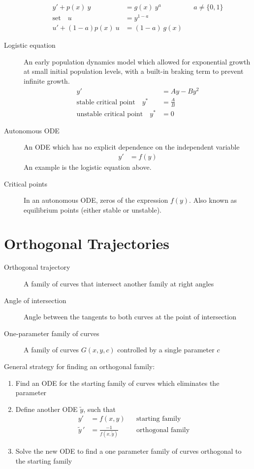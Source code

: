 \begin{description}
\begin{align}
            y' + p(x)\ y       & = g(x)\ y^{a} &  & a \neq \{ 0, 1\} \\
            \text{set} \quad u & = y^{1-a}                           \\
            u' + (1-a)p(x)\ u  & = (1-a)\ g(x)
        \end{align}
    \item[Logistic equation] An early population dynamics model which allowed for exponential
        growth at small initial population levels, with a built-in braking term to prevent infinite
        growth.
        \begin{align}
            y'                                         & = Ay - By^{2} \\
            \text{stable critical point} \quad y^{*}   & = \frac{A}{B} \\
            \text{unstable critical point} \quad y^{*} & = 0
        \end{align}
    \item[Autonomous ODE] An ODE which has no explicit dependence on the independent variable
        \begin{align}
            y' & = f(y)
        \end{align}
        An example is the logistic equation above.
    \item[Critical points] In an autonomous ODE, zeros of the expression $ f(y) $. Also known
        as equilibrium points (either stable or unstable).
\end{description}

\section{Orthogonal Trajectories}

\begin{description}
    \item[Orthogonal trajectory] A family of curves that intersect another family at right angles
    \item[Angle of intersection] Angle between the tangents to both curves at the point of intersection
    \item[One-parameter family of curves] A family of curves $ G(x, y, c) $ controlled by a single parameter $ c $
\end{description}
General strategy for finding an orthogonal family:
\begin{enumerate}
    \item Find an ODE for the starting family of curves which eliminates the parameter
    \item Define another ODE $ \tilde{y} $, such that
          \begin{align}
              y'           & = f(x, y)                    &  & \text{starting family}   \\
              \tilde{y}\,' & = \frac{-1}{f(x, \tilde{y})} &  & \text{orthogonal family}
          \end{align}
    \item Solve the new ODE to find a one parameter family of curves orthogonal to the starting family
\end{enumerate}

